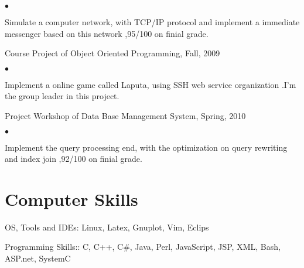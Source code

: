\documentclass[margin,line]{res}
\newenvironment{list1}{
  \begin{list}{\ding{113}}{%
      \setlength{\itemsep}{0in}
      \setlength{\parsep}{0in} \setlength{\parskip}{0in}
      \setlength{\topsep}{0in} \setlength{\partopsep}{0in} 
      \setlength{\leftmargin}{0.17in}}}{\end{list}}
\newenvironment{list2}{
  \begin{list}{$\bullet$}{%
      \setlength{\itemsep}{0in}
      \setlength{\parsep}{0in} \setlength{\parskip}{0in}
      \setlength{\topsep}{0in} \setlength{\partopsep}{0in} 
      \setlength{\leftmargin}{0.2in}}}{\end{list}}
\begin{document}
\begin{resume}
\begin{list1}
\begin{list2}
  \item Simulate a computer network, with TCP/IP protocol and implement a immediate messenger based on this network
,95/100 on finial grade.
  \end{list2}
\item[] Course Project of Object Oriented Programming, Fall, 2009
  \begin{list2}
	\vspace*{.05in}
  \item Implement a online game called Laputa, using SSH web service organization 
.I'm the group leader in this project. 
  \end{list2}
\item[] Project Workshop of Data Base Management System, Spring, 2010
  \begin{list2}
	\vspace*{.05in}
  \item Implement the query processing end, with the optimization on query rewriting and index join
,92/100 on finial grade.
  \end{list2}
\end{list1}
\section{\sc Computer Skills} 
\begin{list1}
\item[] OS, Tools and IDEs: Linux, Latex, Gnuplot, Vim, Eclips
\item[] Programming Skills:: C, C++, C\#, Java, Perl, JavaScript, JSP, XML, Bash, ASP.net, SystemC
\end{list1}
\end{resume}
\end{document}
